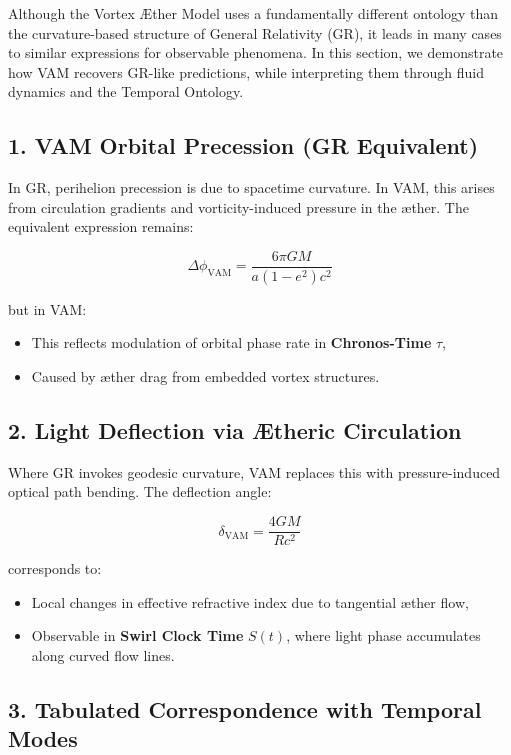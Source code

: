\documentclass[preprint]{revtex4-2}
\begin{document}
Although the Vortex \AE ther Model uses a fundamentally different ontology than the curvature-based structure of General Relativity (GR), it leads in many cases to similar expressions for observable phenomena. In this section, we demonstrate how VAM recovers GR-like predictions, while interpreting them through fluid dynamics and the Temporal Ontology.

\subsection*{1. VAM Orbital Precession (GR Equivalent)}

In GR, perihelion precession is due to spacetime curvature. In VAM, this arises from circulation gradients and vorticity-induced pressure in the \ae ther. The equivalent expression remains:

\[
    \Delta\phi_{\text{VAM}} = \frac{6\pi G M}{a(1 - e^2) c^2}
\]

but in VAM:
\begin{itemize}
    \item This reflects modulation of orbital phase rate in \textbf{Chronos-Time} \( \tau \),
    \item Caused by \ae ther drag from embedded vortex structures.
\end{itemize}

\subsection*{2. Light Deflection via Ætheric Circulation}

Where GR invokes geodesic curvature, VAM replaces this with pressure-induced optical path bending. The deflection angle:

\[
    \delta_{\text{VAM}} = \frac{4 G M}{R c^2}
\]

corresponds to:
\begin{itemize}
    \item Local changes in effective refractive index due to tangential \ae ther flow,
    \item Observable in \textbf{Swirl Clock Time} \( S(t) \), where light phase accumulates along curved flow lines.
\end{itemize}

\subsection*{3. Tabulated Correspondence with Temporal Modes}
\end{document}
